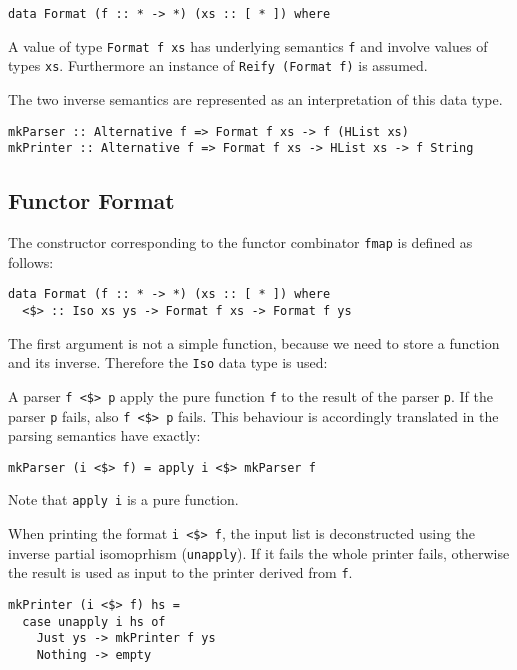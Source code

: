 \documentclass[../Thesis.tex]{subfiles}
\begin{document}
\begin{verbatim}
data Format (f :: * -> *) (xs :: [ * ]) where
\end{verbatim}

A value of type \texttt{Format f xs} has underlying semantics \texttt{f} and involve values of types \texttt{xs}. Furthermore
an instance of \texttt{Reify (Format f)} is assumed.

The two inverse semantics are represented as an interpretation of this data type.
\begin{verbatim}
mkParser :: Alternative f => Format f xs -> f (HList xs)
mkPrinter :: Alternative f => Format f xs -> HList xs -> f String
\end{verbatim}

\subsection{Functor Format}
The constructor corresponding to the functor combinator \texttt{fmap} is defined as follows:

\begin{verbatim}
data Format (f :: * -> *) (xs :: [ * ]) where
  <$> :: Iso xs ys -> Format f xs -> Format f ys
\end{verbatim}

The first argument is not a simple function, because we need to store 
a function and its inverse. Therefore the \texttt{Iso} data type is used:


A parser \texttt{f <\$> p} apply the pure function \texttt{f} to the result of the parser \texttt{p}. If the parser \texttt{p} fails, also \texttt{f <\$> p} fails.
This behaviour is accordingly translated in the parsing semantics have exactly:

\begin{verbatim}
mkParser (i <$> f) = apply i <$> mkParser f
\end{verbatim}

Note that \texttt{apply i} is a pure function.

When printing the format \texttt{i <\$> f}, the input list is deconstructed using the inverse partial isomoprhism (\texttt{unapply}). If it fails the whole printer fails, otherwise the result is used as input to the printer derived from \texttt{f}.

\begin{verbatim}
mkPrinter (i <$> f) hs = 
  case unapply i hs of
    Just ys -> mkPrinter f ys
    Nothing -> empty
\end{verbatim}
\end{document}
